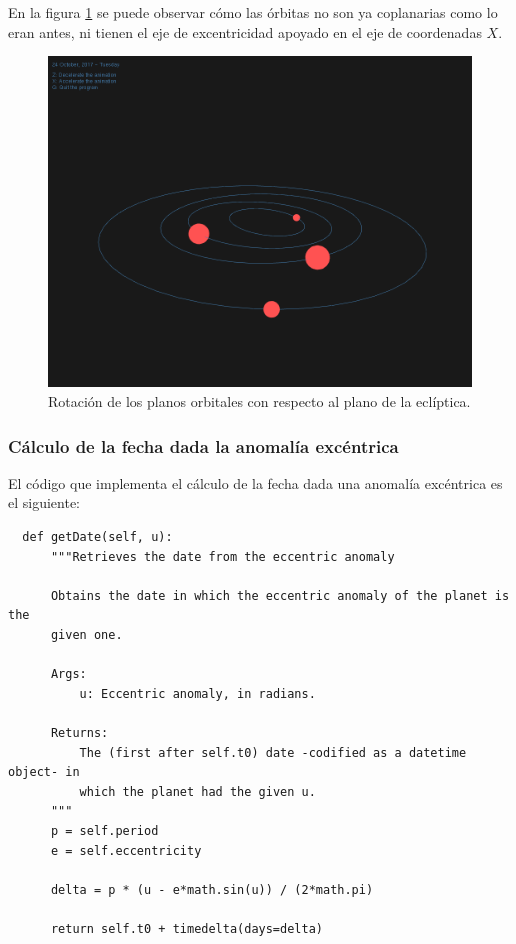 \documentclass[a4paper, 11pt]{article}
\begin{document}
  En la figura \ref{fig_ani} se puede observar cómo las órbitas no son ya coplanarias como lo eran antes, ni tienen el eje de excentricidad apoyado en el eje de coordenadas $X$.

  \begin{figure}[ht!]
      \centering
      \includegraphics[width=140mm]{./screenshot_ANI.png}
      \caption{Rotación de los planos orbitales con respecto al plano de la eclíptica.\label{fig_ani}}
  \end{figure}

  \subsubsection{Cálculo de la fecha dada la anomalía excéntrica}

  El código que implementa el cálculo de la fecha dada una anomalía excéntrica es el siguiente:

  \begin{lstlisting}
  def getDate(self, u):
      """Retrieves the date from the eccentric anomaly

      Obtains the date in which the eccentric anomaly of the planet is the
      given one.

      Args:
          u: Eccentric anomaly, in radians.

      Returns:
          The (first after self.t0) date -codified as a datetime object- in
          which the planet had the given u.
      """
      p = self.period
      e = self.eccentricity

      delta = p * (u - e*math.sin(u)) / (2*math.pi)

      return self.t0 + timedelta(days=delta)
  \end{lstlisting}
\end{document}
